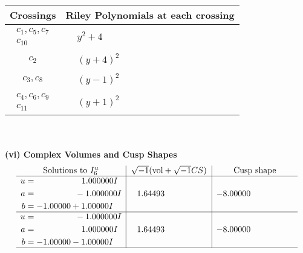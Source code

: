 \documentclass[1p]{elsarticle_modified}
\theoremstyle{definition}
\newcommand{\I}{\sqrt{-1}}
\begin{document}
\begin{tabular}{m{50pt}|m{274pt}}
Crossings & \hspace{64pt}Riley Polynomials at each crossing \\
\hline $$\begin{aligned}c_{1},c_{5},c_{7}\\c_{10}\end{aligned}$$&$\begin{aligned}
&y^2+4
\end{aligned}$\\
\hline $$\begin{aligned}c_{2}\end{aligned}$$&$\begin{aligned}
&(y+4)^2
\end{aligned}$\\
\hline $$\begin{aligned}c_{3},c_{8}\end{aligned}$$&$\begin{aligned}
&(y-1)^2
\end{aligned}$\\
\hline $$\begin{aligned}c_{4},c_{6},c_{9}\\c_{11}\end{aligned}$$&$\begin{aligned}
&(y+1)^2
\end{aligned}$\\
\hline
\end{tabular}\\~\\
\newpage\flushleft \textbf{(vi) Complex Volumes and Cusp Shapes}
$$\begin{array}{c|c|c}  
\text{Solutions to }I^u_{6}& \I (\text{vol} + \sqrt{-1}CS) & \text{Cusp shape}\\
 \hline 
\begin{aligned}
u &= \phantom{-0.000000 -}1.000000 I \\
a &= \phantom{-0.000000 } -1.000000 I \\
b &= -1.00000 + 1.00000 I\end{aligned}
 & \phantom{-}1.64493\phantom{ +0.000000I} & -8.00000\phantom{ +0.000000I} \\ \hline\begin{aligned}
u &= \phantom{-0.000000 } -1.000000 I \\
a &= \phantom{-0.000000 -}1.000000 I \\
b &= -1.00000 - 1.00000 I\end{aligned}
 & \phantom{-}1.64493\phantom{ +0.000000I} & -8.00000\phantom{ +0.000000I}\\
 \hline 
 \end{array}$$\newpage\newpage\renewcommand{\arraystretch}{1}
\end{document}
